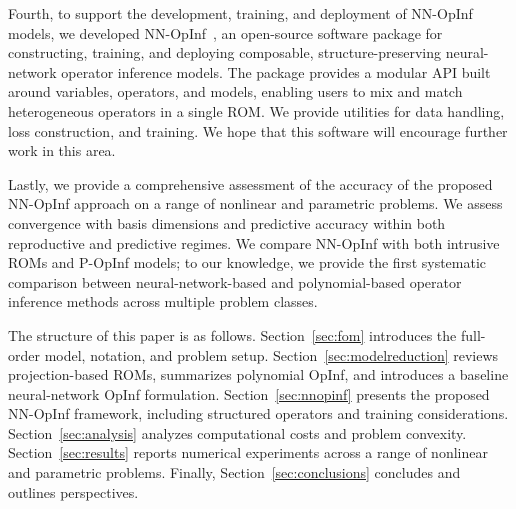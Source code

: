 \documentclass[3p,computermodern,11pt]{elsarticle}
\numberwithin{equation}{section}
\newcommand{\code}[1]{{\ttfamily\color{black} #1}}
\begin{document}
Fourth, to support the development, training, and deployment of NN-OpInf models, we developed \code{NN-OpInf}~\cite{nnopinf}, an open-source software package for constructing, training, and deploying composable, structure-preserving neural-network operator inference models. The package provides a modular API built around variables, operators, and models, enabling users to mix and match heterogeneous operators in a single ROM. We provide utilities for data handling, loss construction, and training.  We hope that this software will encourage further work in this area.

Lastly, we provide a comprehensive assessment of the accuracy of the proposed NN-OpInf approach on a range of nonlinear and parametric problems. We assess convergence with basis dimensions and predictive accuracy within both reproductive and predictive regimes. We compare NN-OpInf with both intrusive ROMs and P-OpInf models; to our knowledge, we provide the first systematic comparison between neural-network-based and polynomial-based operator inference methods across multiple problem classes.

The structure of this paper is as follows. Section~\ref{sec:fom} introduces the full-order model, notation, and problem setup. Section~\ref{sec:modelreduction} reviews projection-based ROMs, summarizes polynomial OpInf, and introduces a baseline neural-network OpInf formulation. Section~\ref{sec:nnopinf} presents the proposed NN-OpInf framework, including structured operators and training considerations. Section~\ref{sec:analysis} analyzes computational costs and problem convexity. Section~\ref{sec:results} reports numerical experiments across a range of nonlinear and parametric problems. Finally, Section~\ref{sec:conclusions} concludes and outlines perspectives.
\end{document}
